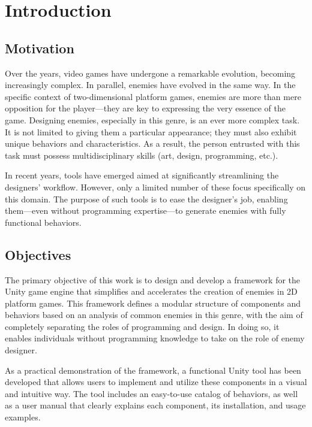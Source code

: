 \chapter*{Introduction}
\label{cap:introduction}


\section{Motivation}
Over the years, video games have undergone a remarkable evolution, becoming increasingly complex. In parallel, enemies have evolved in the same way. In the specific context of two-dimensional platform games, enemies are more than mere opposition for the player—they are key to expressing the very essence of the game. Designing enemies, especially in this genre, is an ever more complex task. It is not limited to giving them a particular appearance; they must also exhibit unique behaviors and characteristics. As a result, the person entrusted with this task must possess multidisciplinary skills (art, design, programming, etc.).

In recent years, tools have emerged aimed at significantly streamlining the designers’ workflow. However, only a limited number of these focus specifically on this domain. The purpose of such tools is to ease the designer’s job, enabling them—even without programming expertise—to generate enemies with fully functional behaviors.

\section{Objectives}
The primary objective of this work is to design and develop a framework for the Unity game engine that simplifies and accelerates the creation of enemies in 2D platform games. This framework defines a modular structure of components and behaviors based on an analysis of common enemies in this genre, with the aim of completely separating the roles of programming and design. In doing so, it enables individuals without programming knowledge to take on the role of enemy designer.

As a practical demonstration of the framework, a functional Unity tool has been developed that allows users to implement and utilize these components in a visual and intuitive way. The tool includes an easy-to-use catalog of behaviors, as well as a user manual that clearly explains each component, its installation, and usage examples.

